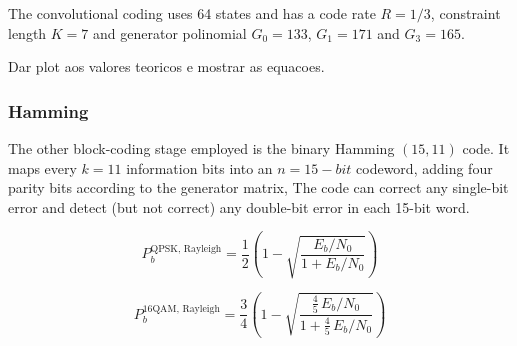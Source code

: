 The convolutional coding uses 64 states and has a code rate $R = 1/3$, constraint length $K = 7$ and generator polinomial $G_0 = 133$, $G_1=171$ and $G_3 = 165$. 


Dar plot aos valores teoricos e mostrar as equacoes.

\subsubsection{Hamming}

The other block-coding stage employed is the binary Hamming $(15,11)$ code. It maps every $k=11$ information bits into an $n=15-bit$ codeword, adding four parity bits according to the generator matrix, The code can correct any single-bit error and detect (but not correct) any double-bit error in each 15-bit word.

\begin{equation}
P_b^{\text{QPSK, Rayleigh}} = \frac{1}{2} \left( 1 - \sqrt{ \frac{E_b / N_0}{1 + E_b / N_0} } \right )
\end{equation}

\begin{equation}
      P_b^{\text{16QAM, Rayleigh}} = \frac{3}{4} \left( 1 - \sqrt{ \frac{ \frac{4}{5} \, E_b / N_0 }{ 1 + \frac{4}{5} \, E_b / N_0 } } \right )
\end{equation}


